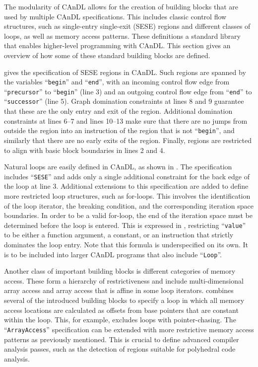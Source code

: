     The modularity of CAnDL allows for the creation of building blocks that are
    used by multiple CAnDL specifications.
    This includes classic control flow structures, such as single-entry
    single-exit (SESE) regions and different classes of loops, as well as memory
    access patterns.
    These definitions a standard library that enables higher-level programming
    with CAnDL.
    This section gives an overview of how some of these standard building
    blocks are defined.

     gives the specification of SESE regions in CAnDL.
    Such regions are spanned by the variables ``{\tt begin}'' and ``{\tt end}'',
    with an incoming control flow edge from ``{\tt precursor}'' to
    ``{\tt begin}'' (line 3) and
    an outgoing control flow edge from ``{\tt end}'' to ``{\tt successor}''
    (line 5).
    Graph domination constraints at lines 8 and 9 guarantee that these are the
    only entry and exit of the region.
    Additional domination constraints at lines 6--7 and lines 10--13 make sure
    that there are no jumps from outside the region into an instruction of the
    region that is not ``{\tt begin}'', and similarly that there are no early
    exits of the region.
    Finally, regions are restricted to align with basic block boundaries in
    lines 2 and 4.

    Natural loops are easily defined in CAnDL, as shown in .
    The specification includes ``{\tt SESE}'' and adds only a single additional
    constraint for the back edge of the loop at line 3.
    Additional extensions to this specification are added to define more
    restricted loop structures, such as for-loops.
    This involves the identification of the loop iterator, the breaking
    condition, and the corresponding iteration space boundaries.
    In order to be a valid for-loop, the end of the iteration space must be
    determined before the loop is entered.
    This is expressed in , restricting ``{\tt value}'' to be
    either a function argument, a constant, or an instruction that strictly
    dominates the loop entry.
    Note that this formula is underspecified on its own.
    It is to be included into larger CAnDL programs that also include
    ``{\tt Loop}''.

    Another class of important building blocks is different categories of
    memory access.
    These form a hierarchy of restrictiveness and include multi-dimensional
    array access and array access that is affine in some loop iterators.
     combines several of the introduced building blocks to
    specify a loop in which all memory access locations are calculated as
    offsets from base pointers that are constant within the loop.
    This, for example, excludes loops with pointer-chasing.
    The ``{\tt ArrayAccess}'' specification can be extended with more restrictive
    memory access patterns as previously mentioned.
    This is crucial to define advanced compiler analysis passes, such as the
    detection of regions suitable for polyhedral code analysis.

